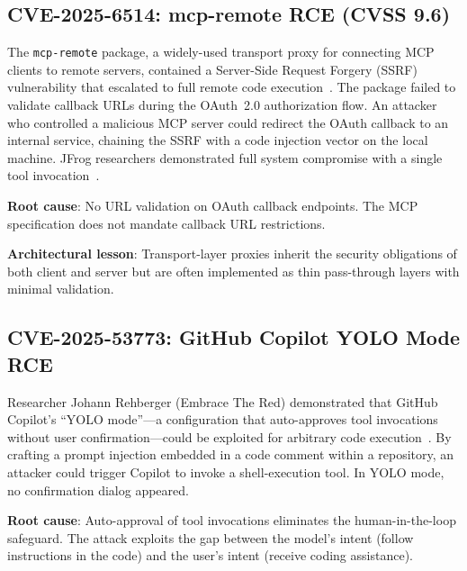 \documentclass[11pt,twocolumn]{article}
\begin{document}
\subsection{CVE-2025-6514: mcp-remote RCE (CVSS 9.6)}

The \texttt{mcp-remote} package, a widely-used transport proxy for connecting MCP clients to remote servers, contained a Server-Side Request Forgery (SSRF) vulnerability that escalated to full remote code execution~\cite{cve-2025-6514}. The package failed to validate callback URLs during the OAuth~2.0 authorization flow. An attacker who controlled a malicious MCP server could redirect the OAuth callback to an internal service, chaining the SSRF with a code injection vector on the local machine. JFrog researchers demonstrated full system compromise with a single tool invocation~\cite{jfrog-mcp}.

\textbf{Root cause}: No URL validation on OAuth callback endpoints. The MCP specification does not mandate callback URL restrictions.

\textbf{Architectural lesson}: Transport-layer proxies inherit the security obligations of both client and server but are often implemented as thin pass-through layers with minimal validation.


\subsection{CVE-2025-53773: GitHub Copilot YOLO Mode RCE}

Researcher Johann Rehberger (Embrace The Red) demonstrated that GitHub Copilot's ``YOLO mode''---a configuration that auto-approves tool invocations without user confirmation---could be exploited for arbitrary code execution~\cite{cve-2025-53773}. By crafting a prompt injection embedded in a code comment within a repository, an attacker could trigger Copilot to invoke a shell-execution tool. In YOLO mode, no confirmation dialog appeared.

\textbf{Root cause}: Auto-approval of tool invocations eliminates the human-in-the-loop safeguard. The attack exploits the gap between the model's intent (follow instructions in the code) and the user's intent (receive coding assistance).
\end{document}
